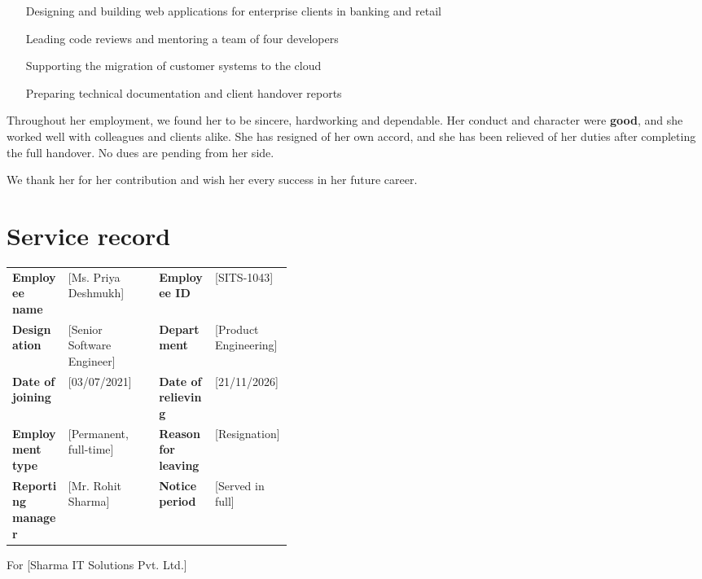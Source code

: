 \documentclass[10pt]{article}
\begin{document}
\begin{itemize}
  \item [Designing and building web applications for enterprise clients in banking and retail]
  \item [Leading code reviews and mentoring a team of four developers]
  \item [Supporting the migration of customer systems to the cloud]
  \item [Preparing technical documentation and client handover reports]
\end{itemize}

Throughout her employment, we found her to be sincere, hardworking and dependable. Her conduct and character were \textbf{good}, and she worked well with colleagues and clients alike. She has resigned of her own accord, and she has been relieved of her duties after completing the full handover. No dues are pending from her side.\par\vspace{4pt}

We thank her for her contribution and wish her every success in her future career.\par\vspace{4pt}

\section{Service record}

\begin{tabularx}{\linewidth}{@{}p{0.2\linewidth}X p{0.2\linewidth}X@{}}
\textbf{Employee name} & [Ms. Priya Deshmukh] & \textbf{Employee ID} & [SITS-1043] \\
\textbf{Designation} & [Senior Software Engineer] & \textbf{Department} & [Product Engineering] \\
\textbf{Date of joining} & [03/07/2021] & \textbf{Date of relieving} & [21/11/2026] \\
\textbf{Employment type} & [Permanent, full-time] & \textbf{Reason for leaving} & [Resignation] \\
\textbf{Reporting manager} & [Mr. Rohit Sharma] & \textbf{Notice period} & [Served in full] \\
\end{tabularx}\par\vspace{2pt}

\vspace{12pt}

For [Sharma IT Solutions Pvt. Ltd.]\par\vspace{4pt}
\end{document}
